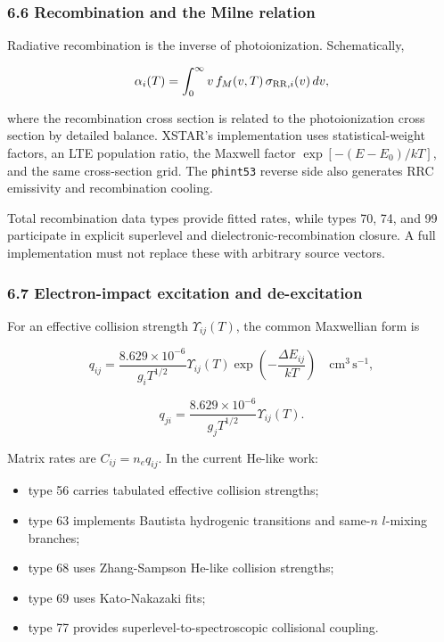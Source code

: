 \documentclass[
  10pt,
]{article}
\newcommand{\passthrough}[1]{#1}
\providecommand{\tightlist}{%
  \setlength{\itemsep}{0pt}\setlength{\parskip}{0pt}}
\begin{document}
\subsubsection{6.6 Recombination and the Milne
relation}\label{recombination-and-the-milne-relation}

Radiative recombination is the inverse of photoionization.
Schematically,

\[
\alpha_i(T) = \int_0^\infty v\,f_M(v,T)\,
\sigma_{{\rm RR},i}(v)\,dv,
\]

where the recombination cross section is related to the photoionization
cross section by detailed balance. XSTAR's implementation uses
statistical-weight factors, an LTE population ratio, the Maxwell factor
\(\exp[-(E-E_0)/kT]\), and the same cross-section grid. The
\passthrough{\lstinline!phint53!} reverse side also generates RRC
emissivity and recombination cooling.

Total recombination data types provide fitted rates, while types 70, 74,
and 99 participate in explicit superlevel and dielectronic-recombination
closure. A full implementation must not replace these with arbitrary
source vectors.

\subsubsection{6.7 Electron-impact excitation and
de-excitation}\label{electron-impact-excitation-and-de-excitation}

For an effective collision strength \(\Upsilon_{{ij}}(T)\), the common
Maxwellian form is

\[
q_{{ij}} = \frac{{8.629\times10^{{-6}}}}{{g_i T^{{1/2}}}}
\Upsilon_{{ij}}(T)\exp\left(-\frac{{\Delta E_{{ij}}}}{{kT}}\right)
\quad \mathrm{{cm^3\,s^{{-1}}}},
\]

\[
q_{{ji}} = \frac{{8.629\times10^{{-6}}}}{{g_j T^{{1/2}}}}
\Upsilon_{{ij}}(T).
\]

Matrix rates are \(C_{{ij}}=n_e q_{{ij}}\). In the current He-like work:

\begin{itemize}
\tightlist
\item
  type 56 carries tabulated effective collision strengths;
\item
  type 63 implements Bautista hydrogenic transitions and same-\(n\)
  \(l\)-mixing branches;
\item
  type 68 uses Zhang-Sampson He-like collision strengths;
\item
  type 69 uses Kato-Nakazaki fits;
\item
  type 77 provides superlevel-to-spectroscopic collisional coupling.
\end{itemize}
\end{document}
